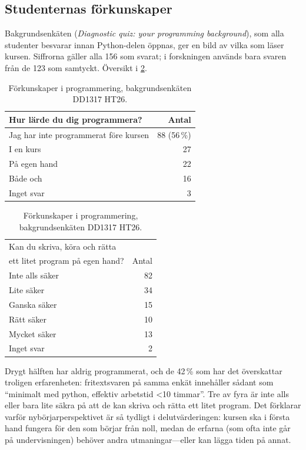 \documentclass[a4paper]{article}
\begin{document}
\begin{refsection}
\section{Studenternas förkunskaper}\label{sec:forkunskaper}

Bakgrundsenkäten (\emph{Diagnostic quiz: your programming background}),
som alla studenter besvarar innan Python-delen öppnas, ger en bild av
vilka som läser kursen. Siffrorna gäller alla 156 som svarat; i
forskningen används bara svaren från de 123 som samtyckt.
Översikt i \cref{tab:forkunskaper}.

\begin{table}\small
  \begin{fullwidth}
\begin{minipage}[t]{0.5\linewidth}\centering
\begin{tabular}{lr}
\toprule
Hur lärde du dig programmera? & Antal \\
\midrule
Jag har inte programmerat före kursen & 88 (56\,\%) \\
I en kurs & 27 \\
På egen hand & 22 \\
Både och & 16 \\
Inget svar & 3 \\
\bottomrule
\end{tabular}
\end{minipage}%
\begin{minipage}[t]{0.48\linewidth}\centering
\begin{tabular}{lr}
\toprule
Kan du skriva, köra och rätta & \\
ett litet program på egen hand? & Antal \\
\midrule
Inte alls säker & 82 \\
Lite säker & 34 \\
Ganska säker & 15 \\
Rätt säker & 10 \\
Mycket säker & 13 \\
Inget svar & 2 \\
\bottomrule
\end{tabular}
\end{minipage}
\end{fullwidth}
    \caption{Förkunskaper i programmering, bakgrundsenkäten DD1317 HT26.}
    \label{tab:forkunskaper}
\end{table}

Drygt hälften har aldrig programmerat, och de 42\,\% som har det
överskattar troligen erfarenheten: fritextsvaren på samma enkät
innehåller sådant som \enquote{minimalt med python, effektiv arbetstid
<10 timmar}. Tre av fyra är inte alls eller bara lite säkra på att de
kan skriva och rätta ett litet program. Det förklarar varför
nybörjarperspektivet är så tydligt i delutvärderingen: kursen ska i
första hand fungera för den som börjar från noll, medan de erfarna (som
ofta inte går på undervisningen) behöver andra utmaningar---eller kan lägga 
tiden på annat.


\end{refsection}
\end{document}
